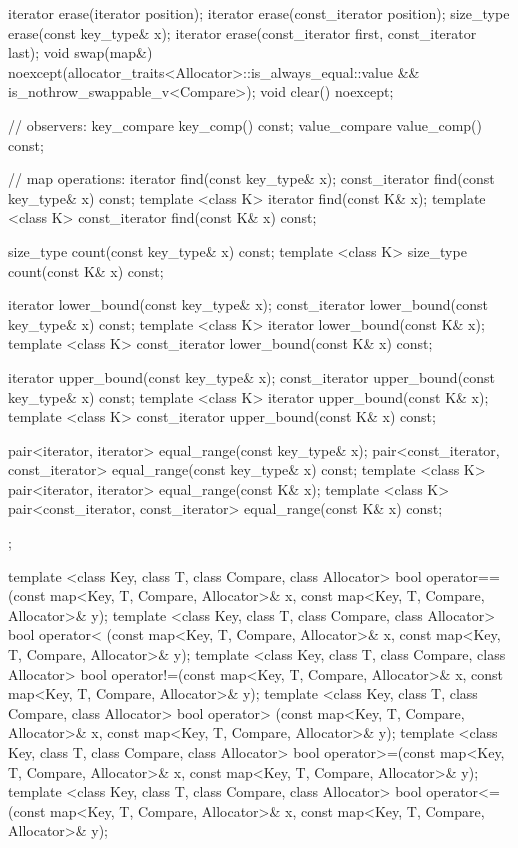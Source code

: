 \begin{codeblock}
{{    iterator  erase(iterator position);
    iterator  erase(const_iterator position);
    size_type erase(const key_type& x);
    iterator  erase(const_iterator first, const_iterator last);
    void      swap(map&)
      noexcept(allocator_traits<Allocator>::is_always_equal::value &&
               is_nothrow_swappable_v<Compare>);
    void      clear() noexcept;

    // observers:
    key_compare key_comp() const;
    value_compare value_comp() const;

    // map operations:
    iterator       find(const key_type& x);
    const_iterator find(const key_type& x) const;
    template <class K> iterator       find(const K& x);
    template <class K> const_iterator find(const K& x) const;

    size_type      count(const key_type& x) const;
    template <class K> size_type count(const K& x) const;

    iterator       lower_bound(const key_type& x);
    const_iterator lower_bound(const key_type& x) const;
    template <class K> iterator       lower_bound(const K& x);
    template <class K> const_iterator lower_bound(const K& x) const;

    iterator       upper_bound(const key_type& x);
    const_iterator upper_bound(const key_type& x) const;
    template <class K> iterator       upper_bound(const K& x);
    template <class K> const_iterator upper_bound(const K& x) const;

    pair<iterator, iterator>               equal_range(const key_type& x);
    pair<const_iterator, const_iterator>   equal_range(const key_type& x) const;
    template <class K>
      pair<iterator, iterator>             equal_range(const K& x);
    template <class K>
      pair<const_iterator, const_iterator> equal_range(const K& x) const;
  };

  template <class Key, class T, class Compare, class Allocator>
    bool operator==(const map<Key, T, Compare, Allocator>& x,
                    const map<Key, T, Compare, Allocator>& y);
  template <class Key, class T, class Compare, class Allocator>
    bool operator< (const map<Key, T, Compare, Allocator>& x,
                    const map<Key, T, Compare, Allocator>& y);
  template <class Key, class T, class Compare, class Allocator>
    bool operator!=(const map<Key, T, Compare, Allocator>& x,
                    const map<Key, T, Compare, Allocator>& y);
  template <class Key, class T, class Compare, class Allocator>
    bool operator> (const map<Key, T, Compare, Allocator>& x,
                    const map<Key, T, Compare, Allocator>& y);
  template <class Key, class T, class Compare, class Allocator>
    bool operator>=(const map<Key, T, Compare, Allocator>& x,
                    const map<Key, T, Compare, Allocator>& y);
  template <class Key, class T, class Compare, class Allocator>
    bool operator<=(const map<Key, T, Compare, Allocator>& x,
                    const map<Key, T, Compare, Allocator>& y);

}
\end{codeblock}
